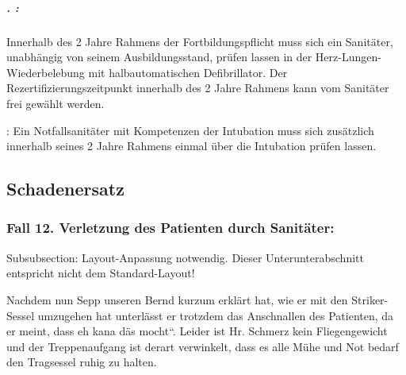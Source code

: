 \subparagraph*{ . :}

Innerhalb des 2 Jahre Rahmens der Fortbildungspflicht muss sich ein
Sanitäter, unabhängig von seinem Ausbildungsstand, pr\"ufen lassen
in der Herz-Lungen-Wiederbelebung mit halbautomatischen Defibrillator.
Der Rezertifizierungszeitpunkt innerhalb des 2 Jahre Rahmens kann vom
Sanitäter frei gewählt werden.

: Ein Notfallsanitäter mit
Kompetenzen der Intubation muss sich zusätzlich innerhalb seines 2
Jahre Rahmens einmal \"uber die Intubation pr\"ufen lassen.




\subsection{Schadenersatz}

\subsubsection{Fall 12. Verletzung des Patienten durch
Sanitäter:}
\begin{anfxwarning}[author=GABS]{Subsubsection: Layout-Anpassung notwendig.}
Dieser Unterunterabschnitt entspricht nicht dem Standard-Layout!
\end{anfxwarning}


Nachdem nun Sepp unseren Bernd kurzum erklärt hat, wie er mit den
Striker-Sessel umzugehen hat unterlässt er trotzdem das Anschnallen
des Patienten, da er meint, dass {\quotedblbase}eh kana däs
mocht{\textquotedblleft}. Leider ist Hr. Schmerz kein Fliegengewicht
und der Treppenaufgang ist derart verwinkelt, dass es alle M\"uhe und
Not bedarf den Tragsessel ruhig zu halten.

